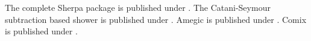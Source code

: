 \documentclass{article}
\begin{document}
The complete Sherpa package is published under \cite{Gleisberg:2008ta}.
The Catani-Seymour subtraction based shower is published under \cite{Schumann:2007mg}.
Amegic is published under \cite{Krauss:2001iv}.
Comix is published under \cite{Gleisberg:2008fv}.
\end{document}
